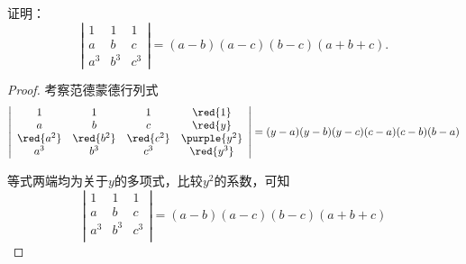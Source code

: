 \begin{frame}

\begin{testexample}
  证明：
  $$
  \left|
    \begin{array}{ccc}
      1   &   1   &   1\\
      a   &   b   &   c\\
      a^3 &   b^3 &   c^3
    \end{array}
  \right| = (a-b)(a-c)(b-c)(a+b+c).
  $$
\end{testexample}\pause

\begin{proof}
考察范德蒙德行列式
$$
\left|
  \begin{array}{cccc}
    1   &   1   &   1   & \red{1}\\
    a   &   b   &   c   & \red{y}\\
    \red{a^2} &   \red{b^2} &   \red{c^2} & \purple{y^2}\\
    a^3 &   b^3 &   c^3 & \red{y^3}\\
  \end{array}
\right|
= (y-a)(y-b)(y-c)(c-a)(c-b)(b-a)
$$

等式两端均为关于$y$的多项式，比较$y^2$的系数，可知
$$
\left|
  \begin{array}{cccc}
    1   &   1   &   1  \\ 
    a   &   b   &   c  \\
    a^3 &   b^3 &   c^3\\
  \end{array}
\right| = (a-b)(a-c)(b-c)(a+b+c)
$$
\end{proof}


\end{frame}

